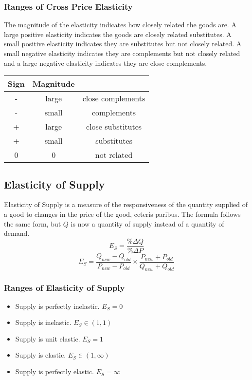 \documentclass[letterpaper, 12pt]{article}
\begin{document}
\subsubsection{Ranges of Cross Price Elasticity}
The magnitude of the elasticity indicates how closely related the goods are.
A large positive elasticity indicates the goods are closely related substitutes.
A small positive elasticity indicates they are substitutes but not closely
related. A small negative elasticity indicates they are complements but not
closely related and a large negative elasticity indicates they are close
complements.
\begin{center}
  \begin{tabular}{|c|c|c|}
    \hline
    Sign & Magnitude & \\ \hline
    -    & large     & close complements\\ \hline
    -    & small     & complements \\ \hline
    +    & large     & close substitutes \\ \hline
    +    & small     & substitutes \\ \hline
    0    & 0         & not related \\ \hline
  \end{tabular}
\end{center}

\subsection{Elasticity of Supply}
Elasticity of Supply is a measure of the responsiveness of the quantity supplied
of a good to changes in the price of the good, ceteris paribus. The formula
follows the same form, but \( Q \) is now a quantity of supply instead of a
quantity of demand.
\[ E_{S} = \frac{\%\Delta Q}{\%\Delta P} \]
\[ E_{S} = \frac{Q_{new}-Q_{old}}{P_{new}-P_{old}}\times
           \frac{P_{new}+P_{old}}{Q_{new}+Q_{old}} \]

\subsubsection{Ranges of Elasticity of Supply}
\begin{itemize}
  \item Supply is perfectly inelastic. \( E_{S} = 0 \)
  \item Supply is inelastic. \( E_{S} \in (1, 1) \)
  \item Supply is unit elastic. \( E_{S} = 1 \)
  \item Supply is elastic. \( E_{S} \in (1, \infty) \)
  \item Supply is perfectly elastic. \( E_{S} = \infty \)
\end{itemize}
\end{document}
